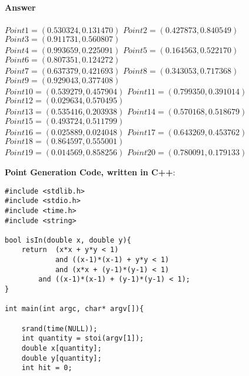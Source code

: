 \documentclass[10pt]{exam}
\begin{document}
\begin{questions}
\begin{parts}
		\paragraph{Answer\\}
		$Point1=(0.530324, 0.131470)$ \hspace{0.1cm} $Point2=(0.427873, 0.840549)$ \hspace{0.1cm} $Point3=(0.911731, 0.560807)$ \\
		$Point4=(0.993659, 0.225091)$ \hspace{0.1cm}
		$Point5=(0.164563, 0.522170)$ \hspace{0.1cm} $Point6=(0.807351, 0.124272)$ \\ 
		$Point7=(0.637379, 0.421693)$ \hspace{0.1cm} $Point8=(0.343053, 0.717368)$ \hspace{0.1cm}
		$Point9=(0.929043, 0.377408)$ \\ 
		$Point10=(0.539279, 0.457904)$ \hspace{0.1cm} $Point11=(0.799350, 0.391014)$ \hspace{0.1cm} $Point12=(0.029634, 0.570495)$ \\
		$Point13=(0.535416, 0.203938)$ \hspace{0.1cm} $Point14=(0.570168, 0.518679)$ \hspace{0.1cm} $Point15=(0.493724, 0.511799)$ \\ 
		$Point16=(0.025889, 0.024048)$ \hspace{0.1cm}
		$Point17=(0.643269, 0.453762)$ \hspace{0.1cm} $Point18=(0.864597, 0.555001)$ \\ 
		$Point19=(0.014569, 0.858256)$ \hspace{0.1cm} $Point20=(0.780091, 0.179133)$ \hspace{0.1cm}
		
		\textbf{Point Generation Code, written in C++}:
		\begin{lstlisting}
#include <stdlib.h>
#include <stdio.h>
#include <time.h>
#include <string>

bool isIn(double x, double y){
    return  (x*x + y*y < 1) 
    		and ((x-1)*(x-1) + y*y < 1) 
    		and (x*x + (y-1)*(y-1) < 1) 
   		and ((x-1)*(x-1) + (y-1)*(y-1) < 1);
}

int main(int argc, char* argv[]){
    
    srand(time(NULL));
    int quantity = stoi(argv[1]);
    double x[quantity];
    double y[quantity];
    int hit = 0;


\end{lstlisting}
\end{parts}
\end{questions}
\end{document}
